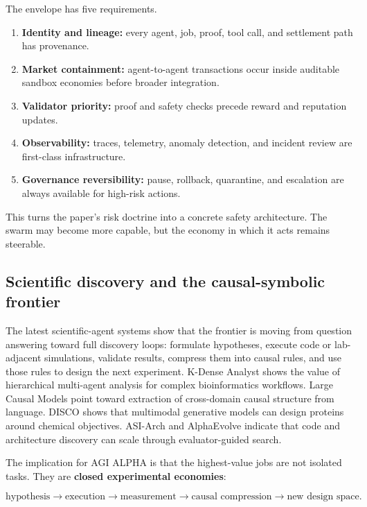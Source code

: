 \documentclass[11pt]{article}
\providecommand{\tightlist}{\setlength{\itemsep}{0pt}\setlength{\parskip}{0pt}}
\begin{document}
The envelope has five requirements.

\begin{enumerate}
\def\labelenumi{\arabic{enumi}.}
\tightlist
\item
  \textbf{Identity and lineage:} every agent, job, proof, tool call, and
  settlement path has provenance.
\item
  \textbf{Market containment:} agent-to-agent transactions occur inside
  auditable sandbox economies before broader integration.
\item
  \textbf{Validator priority:} proof and safety checks precede reward
  and reputation updates.
\item
  \textbf{Observability:} traces, telemetry, anomaly detection, and
  incident review are first-class infrastructure.
\item
  \textbf{Governance reversibility:} pause, rollback, quarantine, and
  escalation are always available for high-risk actions.
\end{enumerate}

This turns the paper's risk doctrine into a concrete safety
architecture. The swarm may become more capable, but the economy in
which it acts remains steerable.

\subsection{Scientific discovery and the causal-symbolic
frontier}\label{scientific-discovery-and-the-causal-symbolic-frontier}

The latest scientific-agent systems show that the frontier is moving
from question answering toward full discovery loops: formulate
hypotheses, execute code or lab-adjacent simulations, validate results,
compress them into causal rules, and use those rules to design the next
experiment. K-Dense Analyst shows the value of hierarchical multi-agent
analysis for complex bioinformatics workflows. Large Causal Models point
toward extraction of cross-domain causal structure from language. DISCO
shows that multimodal generative models can design proteins around
chemical objectives. ASI-Arch and AlphaEvolve indicate that code and
architecture discovery can scale through evaluator-guided search.

The implication for AGI ALPHA is that the highest-value jobs are not
isolated tasks. They are \textbf{closed experimental economies}:

\[
\text{hypothesis}
\rightarrow
\text{execution}
\rightarrow
\text{measurement}
\rightarrow
\text{causal compression}
\rightarrow
\text{new design space}.
\]
\end{document}
